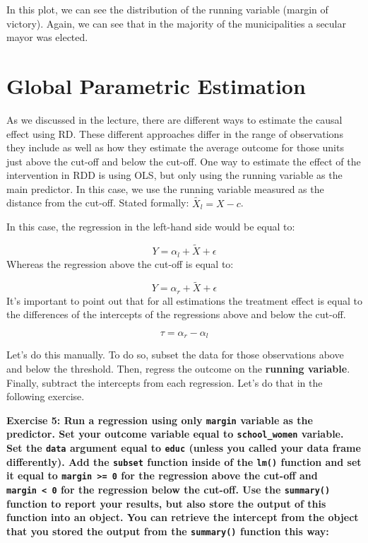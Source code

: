 \documentclass[
  letterpaper,
  DIV=11,
  numbers=noendperiod]{scrreprt}
\begin{document}
\hfill\break

In this plot, we can see the distribution of the running variable
(margin of victory). Again, we can see that in the majority of the
municipalities a secular mayor was elected.

\hfill\break

\hypertarget{global-parametric-estimation}{%
\section{Global Parametric
Estimation}\label{global-parametric-estimation}}

As we discussed in the lecture, there are different ways to estimate the
causal effect using RD. These different approaches differ in the range
of observations they include as well as how they estimate the average
outcome for those units just above the cut-off and below the cut-off.
One way to estimate the effect of the intervention in RDD is using OLS,
but only using the running variable as the main predictor. In this case,
we use the running variable measured as the distance from the cut-off.
Stated formally: \(\tilde{X_l} = X - c\).

In this case, the regression in the left-hand side would be equal to:

\[Y= \alpha_l + \tilde{X} + \epsilon\] Whereas the regression above the
cut-off is equal to:

\[Y= \alpha_r + \tilde{X} + \epsilon\] It's important to point out that
for all estimations the treatment effect is equal to the differences of
the intercepts of the regressions above and below the cut-off.

\[\tau = \alpha_r - \alpha_l\]

Let's do this manually. To do so, subset the data for those observations
above and below the threshold. Then, regress the outcome on the
\textbf{running variable}. Finally, subtract the intercepts from each
regression. Let's do that in the following exercise.

\textbf{Exercise 5: Run a regression using only \texttt{margin} variable
as the predictor. Set your outcome variable equal to
\texttt{school\_women} variable. Set the \texttt{data} argument equal to
\texttt{educ} (unless you called your data frame differently). Add the
\texttt{subset} function inside of the \texttt{lm()} function and set it
equal to \texttt{margin\ \textgreater{}=\ 0} for the regression above
the cut-off and \texttt{margin\ \textless{}\ 0} for the regression below
the cut-off. Use the \texttt{summary()} function to report your results,
but also store the output of this function into an object. You can
retrieve the intercept from the object that you stored the output from
the \texttt{summary()} function this way:}
\end{document}
